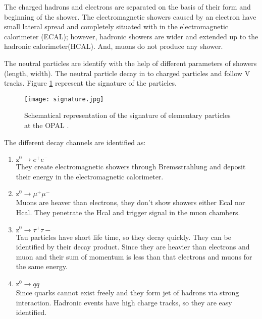The charged hadrons and electrons are separated on the basis of their form and beginning of the shower. The electromagnetic showers caused by an electron have small lateral spread and completely situated with in the electromagnetic calorimeter (ECAL); however, hadronic showers are wider and extended up to the hadronic calorimeter(HCAL). And, muons do not produce any shower.

 The neutral particles are identify with the help of different parameters of showers (length, width). The neutral particle decay in to charged particles and follow V tracks. Figure \ref{fig:signature} represent the signature of the particles. 
 
 \begin{figure}[H]
 	\centering
 	\texttt{[image: signature.jpg]}
 	\caption{Schematical representation of the signature of elementary particles at the OPAL \cite{manual}. }
 	\label{fig:signature}
 \end{figure}
 
 
The different decay channels are identified as:
\begin{enumerate}
\item $ \text{z}^0\rightarrow e^+e^- $\\
They create electromagnetic showers through Bremsstrahlung and deposit their energy in the electromagnetic calorimeter. 

\item $ \text{z}^0\rightarrow \mu^+\mu^- $\\ 
Muons are heaver than electrons, they don't show showers either Ecal nor Hcal. They penetrate the Hcal and trigger signal in the muon chambers.

\item $ \text{z}^0\rightarrow \tau^+\tau-$\\
Tau particles have short life time, so they decay quickly. They can be identified by their decay product. Since they are heavier than electrons and muon and their sum of momentum is less than that electrons and muons for the same energy.

\item $ \text{z}^0\rightarrow q\bar{q}$\\
Since quarks cannot exist freely and they form jet of hadrons via strong interaction. Hadronic events have high charge tracks, so they are easy identified.
\end{enumerate}

